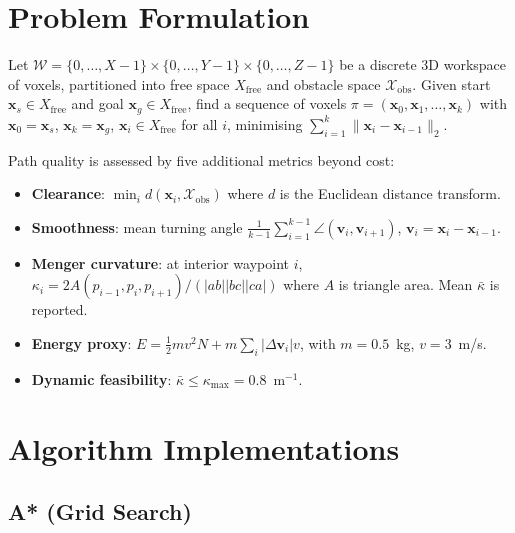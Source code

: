 \documentclass[10pt,twocolumn]{article}
\newcommand{\Xfree}{X_{\mathrm{free}}}
\begin{document}
\section{Problem Formulation}\label{sec:problem}

Let $\mathcal{W} = \{0,\ldots,X{-}1\} \times \{0,\ldots,Y{-}1\}
\times \{0,\ldots,Z{-}1\}$ be a discrete 3D workspace of voxels,
partitioned into free space $\Xfree$ and obstacle space $\mathcal{X}_\mathrm{obs}$.
Given start $\mathbf{x}_s \in \Xfree$ and goal $\mathbf{x}_g \in
\Xfree$, find a sequence of voxels
$\pi = (\mathbf{x}_0, \mathbf{x}_1, \ldots, \mathbf{x}_k)$
with $\mathbf{x}_0 = \mathbf{x}_s$, $\mathbf{x}_k = \mathbf{x}_g$,
$\mathbf{x}_i \in \Xfree$ for all $i$,
minimising $\sum_{i=1}^k \|\mathbf{x}_i - \mathbf{x}_{i-1}\|_2$.

Path quality is assessed by five additional metrics beyond cost:
\begin{itemize}
  \item \textbf{Clearance}: $\min_i d(\mathbf{x}_i, \mathcal{X}_\mathrm{obs})$
        where $d$ is the Euclidean distance transform.
  \item \textbf{Smoothness}: mean turning angle
        $\frac{1}{k-1}\sum_{i=1}^{k-1}\angle(\mathbf{v}_i, \mathbf{v}_{i+1})$,
        $\mathbf{v}_i = \mathbf{x}_i - \mathbf{x}_{i-1}$.
  \item \textbf{Menger curvature}: at interior waypoint $i$,
        $\kappa_i = 2A(p_{i-1},p_i,p_{i+1})/(|ab||bc||ca|)$
        where $A$ is triangle area.  Mean $\bar\kappa$ is reported.
  \item \textbf{Energy proxy}: $E = \tfrac{1}{2}mv^2 N + m\sum_i
        |\Delta\mathbf{v}_i|v$, with $m=0.5$~kg, $v=3$~m/s.
  \item \textbf{Dynamic feasibility}: $\bar\kappa \leq \kappa_\mathrm{max}
        = 0.8$~m$^{-1}$.
\end{itemize}

\section{Algorithm Implementations}\label{sec:algorithms}

\subsection{A* (Grid Search)}
\end{document}
